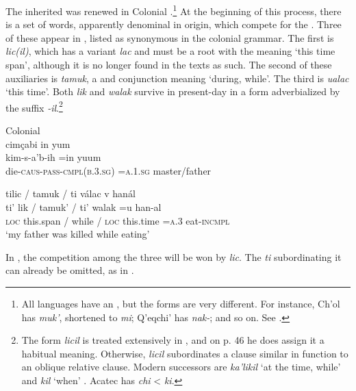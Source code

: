 \documentclass[output=paper]{langsci/langscibook}
\begin{document}
The inherited  was renewed in Colonial  .\footnote{All  languages have an  , but the forms are very different. For instance, Ch'ol has \textit{muk’}, shortened to \textit{mi}; Q’eqchi’ has \textit{nak-}; and so on. See \citet{Vinogradov2014}.} At the beginning of this process, there is a set of words, apparently denominal in origin, which compete for the . Three of these appear in , listed as synonymous in the colonial grammar. The first is \textit{lic(il)}, which has a variant \textit{lac} and must be a root with the meaning ‘this time span’, although it is no longer found in the texts as such. The second of these auxiliaries is \textit{tamuk}, a  and conjunction meaning ‘during, while’. The third is \textit{ualac} ‘this time’. Both \textit{lik} and \textit{walak} survive in present-day  in a form adverbialized by the suffix \textit{{}-il}.\footnote{The form \textit{licil} is treated extensively in \citet{Coronel1620}, and on p. 46 he does assign it a habitual meaning. Otherwise, \textit{licil} subordinates a clause similar in function to an oblique relative clause. Modern successors are  \textit{ka’likil} ‘at the time, while’ and  \textit{kil} ‘when’ \citep[26]{Hofling1991}. Acatec  has \textit{chi} {\textless} \textit{ki}.}



\ea\label{ex:lehmann:24}
Colonial  \\
       cimçabi                 in       yum\\
\gll        kim-s-a’b-ih            =in      yuum\\
die-\textsc{caus-pass-cmpl(b.3.sg)}  =\textsc{a.1.sg}    master/father\\\newpage

  tilic          /  tamuk  /  ti    válac     v       hanál\\
\gll  ti’    lik      /  tamuk’  /  ti’    walak    =u    han-al\\
\textsc{loc} this.span  /  while  /  \textsc{loc}  this.time  =\textsc{a.3}    eat-\textsc{incmpl}\\
\glt ‘my father was killed while eating’ \citep[57]{Coronel1620}
\z



In , the competition among the three  will be won by \textit{lic}. The  \textit{ti} subordinating it can already be omitted, as in .
\end{document}
